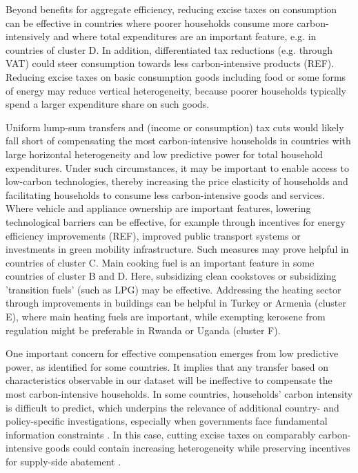 \documentclass[12pt, a4paper]{article}
\begin{document}
Beyond benefits for aggregate efficiency, reducing excise taxes on consumption can be effective in countries where poorer households consume more carbon-intensively and where total expenditures are an important feature, e.g. in countries of cluster D. In addition, differentiated tax reductions (e.g. through VAT) could steer consumption towards less carbon-intensive products (REF). Reducing excise taxes on basic consumption goods including food or some forms of energy may reduce vertical heterogeneity, because poorer households typically spend a larger expenditure share on such goods. 

Uniform lump-sum transfers and (income or consumption) tax cuts would likely fall short of compensating the most carbon-intensive households in countries with large horizontal heterogeneity and low predictive power for total household expenditures. Under such circumstances, it may be important to enable access to low-carbon technologies, thereby increasing the price elasticity of households and facilitating households to consume less carbon-intensive goods and services. Where vehicle and appliance ownership are important features, lowering technological barriers can be effective, for example through incentives for energy efficiency improvements (REF), improved public transport systems or investments in green mobility infrastructure. Such measures may prove helpful in countries of cluster C. %
Main cooking fuel is an important feature in some countries of cluster B and D. Here, subsidizing clean cookstoves or subsidizing 'transition fuels' (such as LPG) may be effective. Addressing the heating sector through improvements in buildings can be helpful in Turkey or Armenia (cluster E), where main heating fuels are important, while exempting kerosene from regulation might be preferable in Rwanda or Uganda (cluster F). %

One important concern for effective compensation emerges from low predictive power, as identified for some countries. It implies that any transfer based on characteristics observable in our dataset will be ineffective to compensate the most carbon-intensive households. In some countries, households' carbon intensity is difficult to predict, which underpins the relevance of additional country- and policy-specific investigations, especially when governments face fundamental information constraints \autocite{Mirrlees.1971}. In this case, cutting excise taxes on comparably carbon-intensive goods could contain increasing heterogeneity while preserving incentives for supply-side abatement \autocite{Goulder.2008}.
\end{document}
